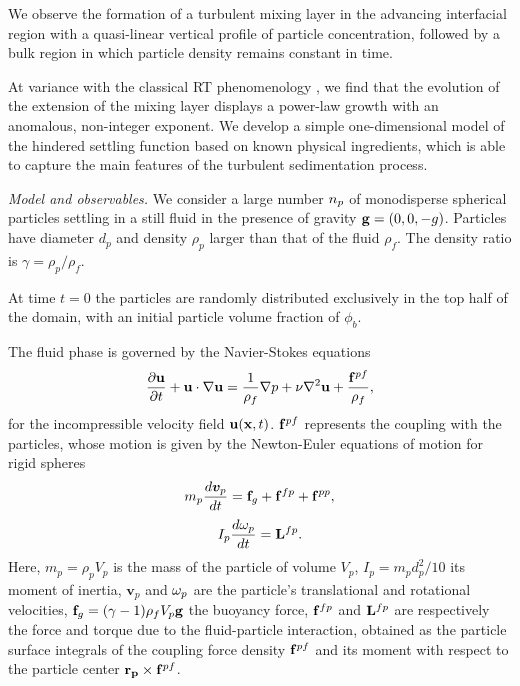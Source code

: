 \documentclass[aps,prl,twocolumn,showpacs,longbibliography]{revtex4-1}
\begin{document}
We observe the formation of a turbulent mixing layer in the advancing interfacial
region with a quasi-linear vertical profile of particle concentration, followed
by a bulk region in which particle density remains constant in time.



At variance with the classical RT phenomenology \cite{boffetta2017incompressible},
we find that the evolution of the extension of the mixing layer
displays a power-law growth with an anomalous, non-integer exponent.
We develop a simple one-dimensional model of the hindered settling function
based on known physical ingredients, which is able to capture the
main features of the
turbulent
sedimentation process.



{\it Model and observables.}
We consider a large number $n_{p}$ of monodisperse spherical particles settling in a still fluid in the presence of gravity ${\bf g}=(0,0,-g)$.
Particles have diameter $d_p$ and density $\rho_p$ larger than that of the fluid $\rho_f$. The density ratio is $\gamma=\rho_p/\rho_f$.


At time $t=0$ the particles are randomly distributed exclusively in the top half of the domain, with an
initial particle volume fraction of $\phi_b$.

The fluid phase is governed by the Navier-Stokes equations
\begin{equation}
{\partial {\bf u} \over \partial t} + {\bf u} \cdot {\bf \nabla u} =
{1 \over \rho_f} {\bf \nabla} p + \nu \nabla^2 {\bf u} + \frac{{\bf f}^{pf}}{\rho_f},
\label{eq1}
\end{equation}
for the incompressible velocity field ${\bf u}({\bf x},t)$.
${\bf f}^{pf}$ represents the coupling with the particles, whose motion is given by the Newton-Euler equations of motion for rigid spheres
\begin{equation}
m_p {d {\bm v}_p \over d t}={\bf f}_g+{\bf f}^{fp}+{\bf f}^{pp},
\label{eq2}
\end{equation}
\begin{equation}
I_p {d {\bf \omega}_p \over d t}={\bf L}^{fp}.
\label{eq3}
\end{equation}
Here, $m_p=\rho_p V_p$ is the mass of the particle of volume $V_p$, $I_p=m_p
d_p^2/10$ its moment of inertia, ${\bm v}_p$ and ${\bf \omega}_p$ are the
particle's translational and rotational velocities,
${\bf f}_g=(\gamma-1)\rho_f V_p {\bf g}$ the buoyancy force,
${\bf f}^{fp}$ and ${\bf L}^{fp}$ are
respectively the force and torque due to the fluid-particle interaction,
obtained as the particle surface integrals of the coupling force density
${\bf f}^{pf}$ and its moment with respect to the particle center
${\bf r_p}\times {\bf f}^{pf}$.
\end{document}
